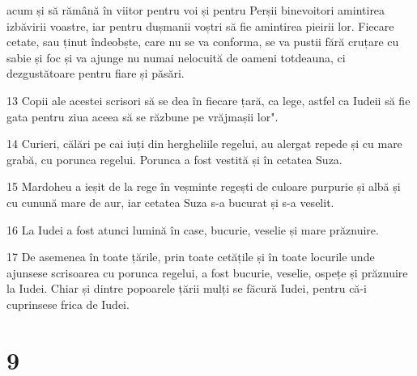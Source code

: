 acum și să rămână în viitor pentru voi și pentru Perșii binevoitori amintirea izbăvirii voastre, iar pentru dușmanii voștri să fie amintirea pieirii lor. Fiecare cetate, sau ținut îndeobște, care nu se va conforma, se va pustii fără cruțare cu sabie și foc și va ajunge nu numai nelocuită de oameni totdeauna, ci dezgustătoare pentru fiare și păsări.
\par 13 Copii ale acestei scrisori să se dea în fiecare țară, ca lege, astfel ca Iudeii să fie gata pentru ziua aceea să se răzbune pe vrăjmașii lor".
\par 14 Curieri, călări pe cai iuți din hergheliile regelui, au alergat repede și cu mare grabă, cu porunca regelui. Porunca a fost vestită și în cetatea Suza.
\par 15 Mardoheu a ieșit de la rege în veșminte regești de culoare purpurie și albă și cu cunună mare de aur, iar cetatea Suza s-a bucurat și s-a veselit.
\par 16 La Iudei a fost atunci lumină în case, bucurie, veselie și mare prăznuire.
\par 17 De asemenea în toate țările, prin toate cetățile și în toate locurile unde ajunsese scrisoarea cu porunca regelui, a fost bucurie, veselie, ospețe și prăznuire la Iudei. Chiar și dintre popoarele țării mulți se făcură Iudei, pentru că-i cuprinsese frica de Iudei.

\chapter{9}

